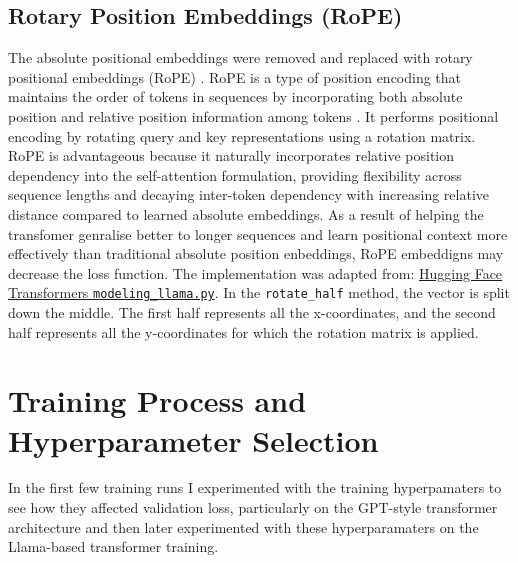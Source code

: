 \documentclass[11pt,a4paper]{article}
\begin{document}
\subsection{Rotary Position Embeddings (RoPE)}

The absolute positional embeddings were removed and replaced with rotary positional embeddings (RoPE) \cite{llama}. RoPE is a type of position encoding that maintains the order of tokens in sequences by incorporating both absolute position and relative position information among tokens \cite{llama-3-guide}. It performs positional encoding by rotating query and key representations using a rotation matrix. RoPE is advantageous because it naturally incorporates relative position dependency into the self-attention formulation, providing flexibility across sequence lengths and decaying inter-token dependency with increasing relative distance \cite{rope} compared to learned absolute embeddings. As a result of helping the transfomer genralise better to longer sequences and learn positional context more effectively than traditional absolute position enbeddings, RoPE embeddigns may decrease the loss function. The implementation was adapted from: \href{https://github.com/huggingface/transformers/blob/main/src/transformers/models/llama/modeling_llama.py}{Hugging Face Transformers \texttt{modeling\_llama.py}}. In the \texttt{rotate\_half} method, the vector is split down the middle. The first half represents all the x-coordinates, and the second half represents all the y-coordinates for which the rotation matrix is applied. 

\section{Training Process and Hyperparameter Selection}

In the first few training runs I experimented with the training hyperpamaters to see how they affected validation loss, particularly on the GPT-style transformer architecture and then later experimented with these hyperparamaters on the Llama-based transformer training.
\end{document}
